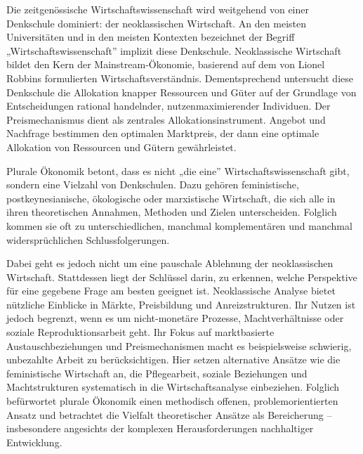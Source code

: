 \documentclass[
  nswissgerman,
  a4paper,
  openany]{book}
\begin{document}
\begin{tcolorbox}[enhanced jigsaw, arc=.35mm, bottomrule=.15mm, bottomtitle=1mm, breakable, colback=white, colbacktitle=quarto-callout-note-color!10!white, colframe=quarto-callout-note-color-frame, coltitle=black, left=2mm, leftrule=.75mm, opacityback=0, opacitybacktitle=0.6, rightrule=.15mm, title={Plurale Ökonomik}, titlerule=0mm, toprule=.15mm, toptitle=1mm]

Die zeitgenössische Wirtschaftswissenschaft wird weitgehend von einer
Denkschule dominiert: der neoklassischen Wirtschaft. An den meisten
Universitäten und in den meisten Kontexten bezeichnet der Begriff
„Wirtschaftswissenschaft'' implizit diese Denkschule. Neoklassische
Wirtschaft bildet den Kern der Mainstream-Ökonomie, basierend auf dem
von Lionel Robbins formulierten Wirtschaftsverständnis. Dementsprechend
untersucht diese Denkschule die Allokation knapper Ressourcen und Güter
auf der Grundlage von Entscheidungen rational handelnder,
nutzenmaximierender Individuen. Der Preismechanismus dient als zentrales
Allokationsinstrument. Angebot und Nachfrage bestimmen den optimalen
Marktpreis, der dann eine optimale Allokation von Ressourcen und Gütern
gewährleistet.

Plurale Ökonomik betont, dass es nicht „die eine''
Wirtschaftswissenschaft gibt, sondern eine Vielzahl von Denkschulen.
Dazu gehören feministische, postkeynesianische, ökologische oder
marxistische Wirtschaft, die sich alle in ihren theoretischen Annahmen,
Methoden und Zielen unterscheiden. Folglich kommen sie oft zu
unterschiedlichen, manchmal komplementären und manchmal
widersprüchlichen Schlussfolgerungen.

Dabei geht es jedoch nicht um eine pauschale Ablehnung der
neoklassischen Wirtschaft. Stattdessen liegt der Schlüssel darin, zu
erkennen, welche Perspektive für eine gegebene Frage am besten geeignet
ist. Neoklassische Analyse bietet nützliche Einblicke in Märkte,
Preisbildung und Anreizstrukturen. Ihr Nutzen ist jedoch begrenzt, wenn
es um nicht-monetäre Prozesse, Machtverhältnisse oder soziale
Reproduktionsarbeit geht. Ihr Fokus auf marktbasierte
Austauschbeziehungen und Preismechanismen macht es beispielsweise
schwierig, unbezahlte Arbeit zu berücksichtigen. Hier setzen alternative
Ansätze wie die feministische Wirtschaft an, die Pflegearbeit, soziale
Beziehungen und Machtstrukturen systematisch in die Wirtschaftsanalyse
einbeziehen. Folglich befürwortet plurale Ökonomik einen methodisch
offenen, problemorientierten Ansatz und betrachtet die Vielfalt
theoretischer Ansätze als Bereicherung -- insbesondere angesichts der
komplexen Herausforderungen nachhaltiger Entwicklung.


\end{tcolorbox}
\end{document}
